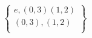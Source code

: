 \documentclass[preview]{standalone}
\begin{document}
\begin{align*}
\begin{Bmatrix}e,(0,3)(1,2)\\     (0,3),     (1,2)\\\end{Bmatrix}
\end{align*}
\end{document}

